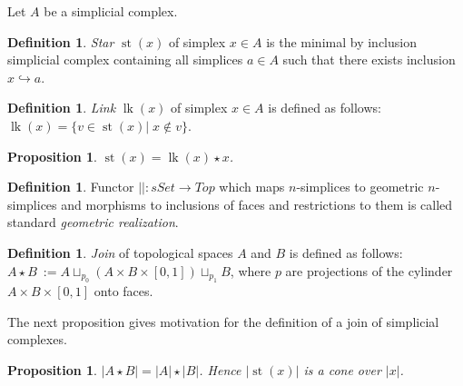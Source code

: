 \documentclass[english,12pt]{article}
\newcounter{stmcounter}[section]
\numberwithin{equation}{section}
\newtheorem{proposition}[stmcounter]{Proposition}
\theoremstyle{definition}
\newtheorem{definition}[stmcounter]{Definition}
\theoremstyle{remark}
\newcommand{\define}[1]{{\textit{#1}}}
\begin{document}
Let $A$ be a simplicial complex.

\begin{definition}
  \define{Star} $\operatorname{st}(x)$ of simplex $x \in A$ is the minimal by inclusion simplicial complex containing all simplices $a \in A$ such that there exists inclusion $x \hookrightarrow a$.
\end{definition}

\begin{definition}
  \define{Link} $\operatorname{lk}(x)$ of simplex $x \in A$ is defined as follows: $\operatorname{lk}(x) = \{v \in \operatorname{st}(x)|\; x \not\in v\}$.
\end{definition}

\begin{proposition}
  $\operatorname{st}(x) = \operatorname{lk}(x) \star x$.
\end{proposition}

\begin{definition}
  Functor $\left|\right| : sSet \to Top$ which maps $n$-simplices to geometric $n$-simplices and morphisms to inclusions of faces and restrictions to them is called standard \define{geometric realization}.
\end{definition}

\begin{definition}
  \define{Join} of topological spaces $A$ and $B$ is defined as follows: $A \star B\ := A \sqcup_{p_0} (A \times B \times [0,1]) \sqcup_{p_1} B$, where $p$ are projections of the cylinder $A \times B \times [0,1]$ onto faces.
\end{definition}

The next proposition gives motivation for the definition of a join of simplicial complexes.

\begin{proposition}
  $\left|A \star B\right| = \left|A\right| \star \left|B\right|$. Hence $\left|\operatorname{st}(x)\right|$ is a cone over $\left|x\right|$.
\end{proposition}
\end{document}
